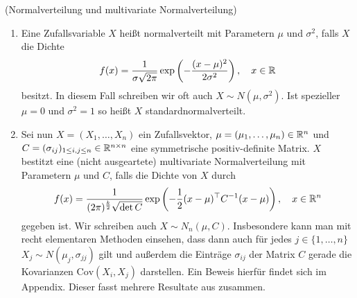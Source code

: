 \begin{Definition}(Normalverteilung und multivariate Normalverteilung)
	\label{normalvert}
	\begin{enumerate}[label=(\alph*)]
		\item Eine Zufallsvariable $ X $ heißt normalverteilt mit Parametern $ \mu $ und $ \sigma^2 $, falls $ X $ die Dichte 
		\[
			f(x) = \frac{1}{\sigma \sqrt{2 \pi}} \exp\left(-\frac{(x-\mu)^2}{2\sigma^2}\right), \quad x \in \mathbb{R} 
		\]
		besitzt. In diesem Fall schreiben wir oft auch $ X \sim N(\mu,\sigma^2) $. Ist spezieller $ \mu = 0 $ und $ \sigma^2 =1$ so heißt $ X $ standardnormalverteilt.
		\item Sei nun $ X = (X_1,\dots,X_n) $ ein Zufallsvektor, $ \mu =(\mu_1,\dots,\mu_n) \in \mathbb{R}^n $ und $ C = (\sigma_{ij})_{1 \leq i,j \leq n} \in \mathbb{R}^{n \times n} $ eine symmetrische positiv-definite Matrix.
		$ X $ bestitzt eine (nicht ausgeartete) multivariate Normalverteilung mit Parametern $ \mu $ und $ C $, falls die Dichte von $ X $ durch 
		\[
			f(x) = \frac{1}{(2\pi)^{\frac{k}{2}}\sqrt{\det C}}\exp\left(-\frac{1}{2}(x-\mu)^{\top}C^{-1}(x-\mu)  \right), \quad x\in \mathbb{R}^n
		\]
		gegeben ist. Wir schreiben auch $ X \sim N_n(\mu,C)  $.
		Insbesondere kann man mit recht elementaren Methoden einsehen, dass dann auch für jedes $ j \in \{ 1,\dots,n\} $ $ X_j \sim N(\mu_j,\sigma_{jj}) $ gilt und außerdem die Einträge $ \sigma_{ij} $ der Matrix $ C $ gerade die Kovarianzen $ \text{Cov}(X_i,X_j) $ darstellen. Ein Beweis hierfür findet sich im Appendix. Dieser fasst mehrere Resultate aus \cite{brokate2016grundwissen} zusammen.
		
	\end{enumerate}
\end{Definition}

